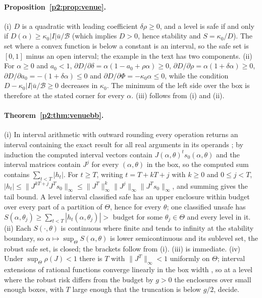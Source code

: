\paragraph{Proposition~\ref{p2:prop:venue}.} (i) $D$ is a quadratic with leading coefficient $\delta\rho\ge0$, and a level is safe if and only if $D(\alpha)\ge\kappa_0|I|\bar u/\mathcal B$ (which implies $D>0$, hence stability and $S=\kappa_0/D$). The set where a convex function is below a constant is an interval, so the safe set is $[0,1]$ minus an open interval; the example in the text has two components. (ii) For $\alpha\ge0$ and $a_0<1$, $\partial D/\partial\delta=\alpha(1-a_0+\rho\alpha)\ge0$, $\partial D/\partial\rho=\alpha(1+\delta\alpha)\ge0$, $\partial D/\partial a_0=-(1+\delta\alpha)\le0$ and $\partial D/\partial\Phi=-\kappa_0\alpha\le0$, while the condition $D-\kappa_0|I|\bar u/\mathcal B\ge0$ decreases in $\kappa_0$. The minimum of the left side over the box is therefore at the stated corner for every $\alpha$. (iii) follows from (i) and (ii).

\paragraph{Theorem~\ref{p2:thm:venuebb}.} (i) In interval arithmetic with outward rounding every operation returns an interval containing the exact result for all real arguments in its operands \citep{p2:rump2010}; by induction the computed interval vectors contain $J(\alpha,\theta)^ts_0(\alpha,\theta)$ and the interval matrices contain $J^j$ for every $(\alpha,\theta)$ in the box, so the computed sum contains $\sum_{t<T}|h_t|$. For $t\ge T$, writing $t=T+kT+j$ with $k\ge0$ and $0\le j<T$, $|h_t|\le\|J^{kT+j}J^Ts_0\|_\infty\le\|J^T\|_\infty^k\|J^j\|_\infty\|J^Ts_0\|_\infty$, and summing gives the tail bound. A level interval classified safe has an upper enclosure within budget over every part of a partition of $\Theta$, hence for every $\theta$; one classified unsafe has $S(\alpha,\theta_j)\ge\sum_{t<T}|h_t(\alpha,\theta_j)|>$ budget for some $\theta_j\in\Theta$ and every level in it. (ii) Each $S(\cdot,\theta)$ is continuous where finite and tends to infinity at the stability boundary, so $\alpha\mapsto\sup_\Theta S(\alpha,\theta)$ is lower semicontinuous and its sublevel set, the robust safe set, is closed; the brackets follow from (i). (iii) is immediate. (iv) Under $\sup_\Theta\rho(J)<1$ there is $T$ with $\|J^T\|_\infty<1$ uniformly on $\Theta$; interval extensions of rational functions converge linearly in the box width \citep{p2:hansen2004}, so at a level where the robust risk differs from the budget by $g>0$ the enclosures over small enough boxes, with $T$ large enough that the truncation is below $g/2$, decide.

